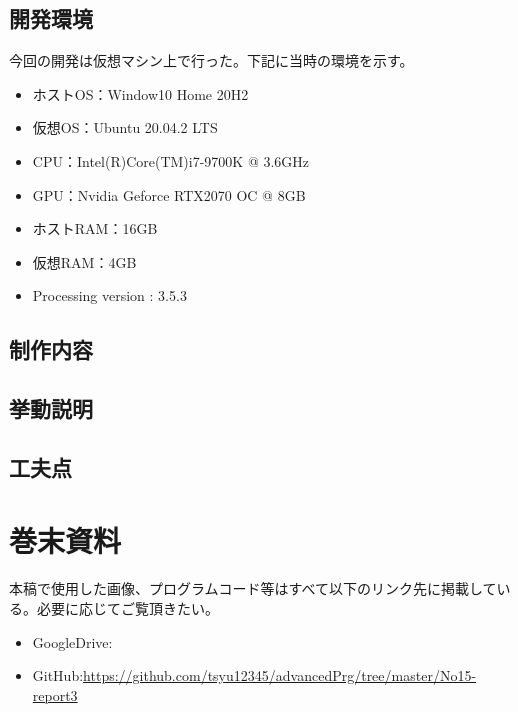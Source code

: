 \documentclass[dvipdfmx]{jsarticle}
\begin{document}
\subsection{開発環境}
今回の開発は仮想マシン上で行った。下記に当時の環境を示す。
\begin{itemize}
  \item ホストOS：Window10 Home 20H2
  \item 仮想OS：Ubuntu 20.04.2 LTS
  \item CPU：Intel(R)Core(TM)i7-9700K @ 3.6GHz
  \item GPU：Nvidia Geforce RTX2070 OC @ 8GB
  \item ホストRAM：16GB
  \item 仮想RAM：4GB
  \item Processing version : 3.5.3
\end{itemize}
\subsection{制作内容}
\subsection{挙動説明}
\subsection{工夫点}
\section{巻末資料}
本稿で使用した画像、プログラムコード等はすべて以下のリンク先に掲載している。必要に応じてご覧頂きたい。
\begin{itemize}
  \item GoogleDrive:\url{}
  \item GitHub:\url{https://github.com/tsyu12345/advancedPrg/tree/master/No15-report3}
\end{itemize}
\end{document}
